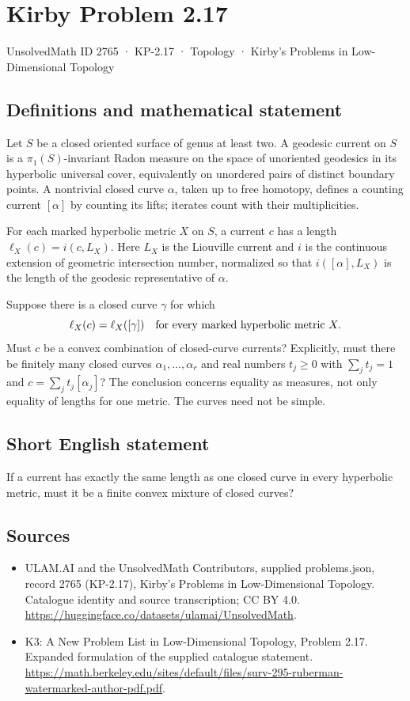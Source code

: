 \documentclass[11pt,a4paper]{article}
\begin{document}
\section*{Kirby Problem 2.17}\label{2765}
{\small UnsolvedMath ID 2765 · KP-2.17 · Topology · Kirby's Problems in Low-Dimensional Topology}
\subsection{Definitions and mathematical statement}
Let $S$ be a closed oriented surface of genus at least two. A geodesic current
on $S$ is a $\pi_1(S)$-invariant Radon measure on the space of unoriented
geodesics in its hyperbolic universal cover, equivalently on unordered pairs
of distinct boundary points. A nontrivial closed curve $\alpha$, taken up to
free homotopy, defines a counting current $[\alpha]$ by counting its lifts;
iterates count with their multiplicities.

For each marked hyperbolic metric $X$ on $S$, a current $c$ has a length
$\ell_X(c)=i(c,L_X)$. Here $L_X$ is the Liouville current and $i$ is the
continuous extension of geometric intersection number, normalized so that
$i([\alpha],L_X)$ is the length of the geodesic representative of $\alpha$.

Suppose there is a closed curve $\gamma$ for which
\[
 \ell_X(c)=\ell_X([\gamma])\quad\hbox{for every marked hyperbolic metric }X.
\]
Must $c$ be a convex combination of closed-curve currents? Explicitly, must
there be finitely many closed curves $\alpha_1,\ldots,\alpha_r$ and real
numbers $t_j\geq0$ with $\sum_jt_j=1$ and
$c=\sum_jt_j[\alpha_j]$? The conclusion concerns equality as measures, not
only equality of lengths for one metric. The curves need not be simple.
\subsection{Short English statement}
If a current has exactly the same length as one closed curve in every hyperbolic metric, must it be a finite convex mixture of closed curves?
\subsection{Sources}
\begin{itemize}
\item[S1] ULAM.AI and the UnsolvedMath Contributors, supplied problems.json, record 2765 (KP-2.17), Kirby's Problems in Low-Dimensional Topology. Catalogue identity and source transcription; CC BY 4.0.
\url{https://huggingface.co/datasets/ulamai/UnsolvedMath}.
\item[S2] K3: A New Problem List in Low-Dimensional Topology, Problem 2.17. Expanded formulation of the supplied catalogue statement.
\url{https://math.berkeley.edu/sites/default/files/surv-295-ruberman-watermarked-author-pdf.pdf}.
\end{itemize}
\end{document}

